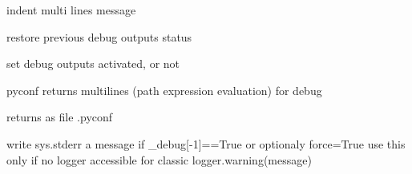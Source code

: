 \documentclass[a4paper,10pt,english]{sphinxmanual}
\begin{document}
\begin{fulllineitems}
\label{commands/apidoc/src:src.debug.indent}
indent multi lines message

\end{fulllineitems}


\begin{fulllineitems}
\label{commands/apidoc/src:src.debug.pop_debug}
restore previous debug outputs status

\end{fulllineitems}


\begin{fulllineitems}
\label{commands/apidoc/src:src.debug.push_debug}
set debug outputs activated, or not

\end{fulllineitems}


\begin{fulllineitems}
\label{commands/apidoc/src:src.debug.saveConfigDbg}
pyconf returns multilines (path expression evaluation) for debug

\end{fulllineitems}


\begin{fulllineitems}
\label{commands/apidoc/src:src.debug.saveConfigStd}
returns as file .pyconf

\end{fulllineitems}


\begin{fulllineitems}
\label{commands/apidoc/src:src.debug.tofix}
write sys.stderr a message if \_debug{[}-1{]}==True or optionaly force=True
use this only if no logger accessible for classic logger.warning(message)

\end{fulllineitems}
\end{document}
